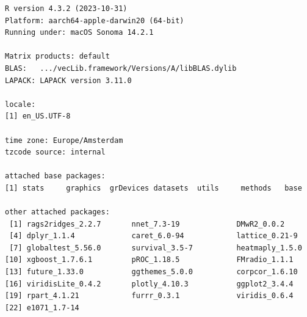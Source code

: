 \documentclass{amsart}
\begin{document}
\begin{verbatim}
R version 4.3.2 (2023-10-31)
Platform: aarch64-apple-darwin20 (64-bit)
Running under: macOS Sonoma 14.2.1

Matrix products: default
BLAS:   .../vecLib.framework/Versions/A/libBLAS.dylib 
LAPACK: LAPACK version 3.11.0

locale:
[1] en_US.UTF-8

time zone: Europe/Amsterdam
tzcode source: internal

attached base packages:
[1] stats     graphics  grDevices datasets  utils     methods   base     

other attached packages:
 [1] rags2ridges_2.2.7       nnet_7.3-19             DMwR2_0.0.2                       
 [4] dplyr_1.1.4             caret_6.0-94            lattice_0.21-9                    
 [7] globaltest_5.56.0       survival_3.5-7          heatmaply_1.5.0               
[10] xgboost_1.7.6.1         pROC_1.18.5             FMradio_1.1.1       
[13] future_1.33.0           ggthemes_5.0.0          corpcor_1.6.10
[16] viridisLite_0.4.2       plotly_4.10.3           ggplot2_3.4.4
[19] rpart_4.1.21            furrr_0.3.1             viridis_0.6.4 
[22] e1071_1.7-14            


\end{verbatim}
\end{document}
